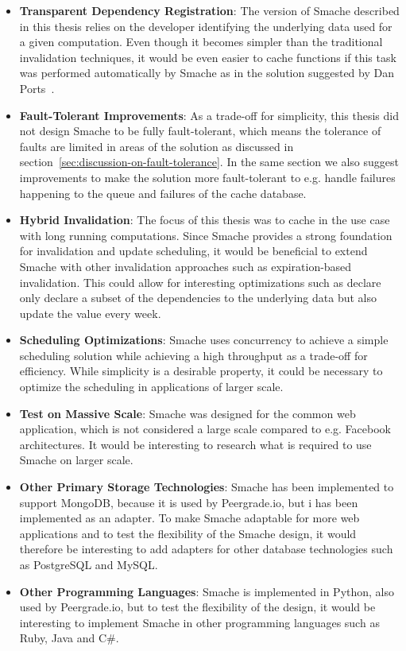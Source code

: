 \begin{itemize}
  \item \textbf{Transparent Dependency Registration}: The version of Smache described in this thesis relies on the developer identifying the underlying data used for a given computation. Even though it becomes simpler than the traditional invalidation techniques, it would be even easier to cache functions if this task was performed automatically by Smache as in the solution suggested by Dan Ports~\cite{paper:liskov}.
  \item \textbf{Fault-Tolerant Improvements}: As a trade-off for simplicity, this thesis did not design Smache to be fully fault-tolerant, which means the tolerance of faults are limited in areas of the solution as discussed in section~\ref{sec:discussion-on-fault-tolerance}. In the same section we also suggest improvements to make the solution more fault-tolerant to e.g. handle failures happening to the queue and failures of the cache database.
  \item \textbf{Hybrid Invalidation}: The focus of this thesis was to cache in the use case with long running computations. Since Smache provides a strong foundation for invalidation and update scheduling, it would be beneficial to extend Smache with other invalidation approaches such as expiration-based invalidation. This could allow for interesting optimizations such as declare only declare a subset of the dependencies to the underlying data but also update the value every week.
  \item \textbf{Scheduling Optimizations}: Smache uses concurrency to achieve a simple scheduling solution while achieving a high throughput as a trade-off for efficiency. While simplicity is a desirable property, it could be necessary to optimize the scheduling in applications of larger scale.
  \item \textbf{Test on Massive Scale}: Smache was designed for the common web application, which is not considered a large scale compared to e.g. Facebook architectures. It would be interesting to research what is required to use Smache on larger scale.
  \item \textbf{Other Primary Storage Technologies}: Smache has been implemented to support MongoDB, because it is used by Peergrade.io, but i has been implemented as an adapter. To make Smache adaptable for more web applications and to test the flexibility of the Smache design, it would therefore be interesting to add adapters for other database technologies such as PostgreSQL and MySQL.
  \item \textbf{Other Programming Languages}: Smache is implemented in Python, also used by Peergrade.io, but to test the flexibility of the design, it would be interesting to implement Smache in other programming languages such as Ruby, Java and C\#.
\end{itemize}




